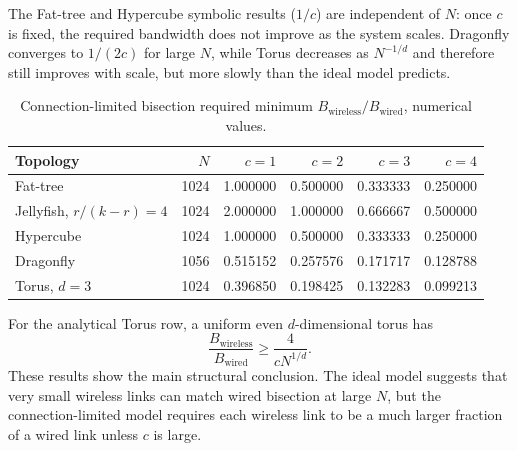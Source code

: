 \documentclass[conference]{IEEEtran}
\begin{document}
\begin{table}[!t]
\centering
\caption{Connection-limited bisection required minimum \(B_{\mathrm{wireless}}/B_{\mathrm{wired}}\), symbolic form.}
\scriptsize
{}
\end{table}

The Fat-tree and Hypercube symbolic results (\(1/c\)) are independent of \(N\): once \(c\) is fixed, the required bandwidth does not improve as the system scales. Dragonfly converges to \(1/(2c)\) for large \(N\), while Torus decreases as \(N^{-1/d}\) and therefore still improves with scale, but more slowly than the ideal model predicts.

\begin{table}[!t]
\centering
\caption{Connection-limited bisection required minimum \(B_{\mathrm{wireless}}/B_{\mathrm{wired}}\), numerical values.}
\small
\begin{tabular}{lrrrrr}
\toprule
Topology & \(N\) & \(c=1\) & \(c=2\) & \(c=3\) & \(c=4\) \\
\midrule
Fat-tree & 1024 & 1.000000 & 0.500000 & 0.333333 & 0.250000 \\
Jellyfish, \(r/(k-r)=4\) & 1024 & 2.000000 & 1.000000 & 0.666667 & 0.500000 \\
Hypercube & 1024 & 1.000000 & 0.500000 & 0.333333 & 0.250000 \\
Dragonfly & 1056 & 0.515152 & 0.257576 & 0.171717 & 0.128788 \\
Torus, \(d=3\) & 1024 & 0.396850 & 0.198425 & 0.132283 & 0.099213 \\
\bottomrule
\end{tabular}
\end{table}

For the analytical Torus row, a uniform even \(d\)-dimensional torus has
\begin{equation}
\frac{B_{\mathrm{wireless}}}{B_{\mathrm{wired}}} \ge \frac{4}{cN^{1/d}}.
\end{equation}
These results show the main structural conclusion. The ideal model suggests that very small wireless links can match wired bisection at large \(N\), but the connection-limited model requires each wireless link to be a much larger fraction of a wired link unless \(c\) is large.
\end{document}
